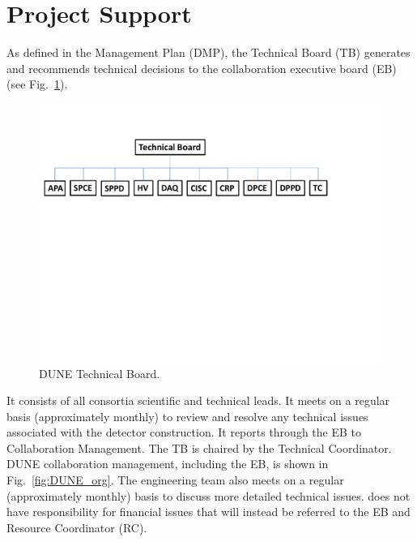 \section{Project Support}
\label{sec:fdsp-coord-supp}

As defined in the  Management Plan (DMP), the 
Technical Board (TB) generates and recommends technical decisions to the 
collaboration executive board (EB) (see Fig.~\ref{fig:TB_org}).
\begin{figure}[htb]
  \begin{center}
    \includegraphics[width=\textwidth]{far-detector-generic/figures/TB_Org_Chart}
    \caption{DUNE Technical Board.}
    \label{fig:TB_org}
  \end{center}
\end{figure}
It consists of all consortia scientific and technical leads. It meets
on a regular basis (approximately monthly) to review and resolve any
technical issues associated with the detector construction. It reports
through the EB to Collaboration Management. The  TB
is chaired by the Technical Coordinator. DUNE collaboration
management, including the EB, is shown in Fig.~\ref{fig:DUNE_org}. The
 engineering team also meets on a regular (approximately monthly)
basis to discuss more detailed technical issues.  does not have
responsibility for financial issues that will instead be referred to
the EB and Resource Coordinator (RC).
